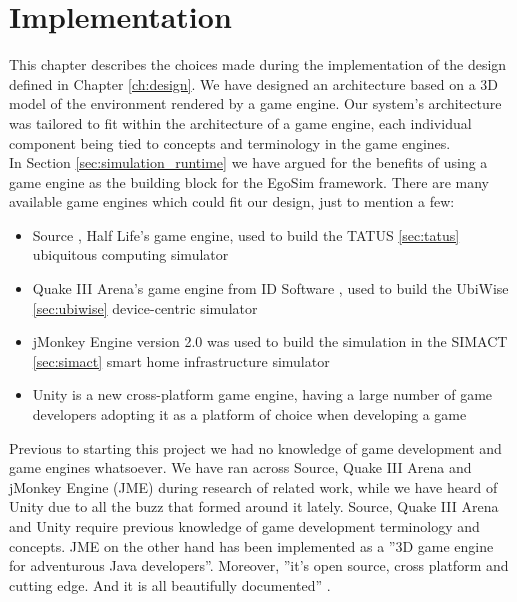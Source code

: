 \chapter{Implementation}\label{ch:implementation}
This chapter describes the choices made during the implementation of the design defined in Chapter \ref{ch:design}. We have designed an architecture based on a 3D model of the environment rendered by a game engine. Our system's architecture was tailored to fit within the architecture of a game engine, each individual component being tied to concepts and terminology in the game engines.\\ 

In Section \ref{sec:simulation_runtime} we have argued for the benefits of using a game engine as the building block for the EgoSim framework. There are many available game engines which could fit our design, just to mention a few:
\begin{itemize}
	\item Source \cite{valvesrc:online}, Half Life's game engine, used to build the TATUS \ref{sec:tatus} ubiquitous computing simulator
	\item Quake III Arena's game engine from ID Software \cite{q3a:online}, used to build the UbiWise \ref{sec:ubiwise} device-centric simulator
	\item jMonkey Engine version 2.0 \cite{jme:online} was used to build the simulation in the SIMACT \ref{sec:simact} smart home infrastructure simulator
	\item Unity \cite{unity:online} is a new cross-platform game engine, having a large number of game developers adopting it as a platform of choice when developing a game
\end{itemize}

Previous to starting this project we had no knowledge of game development and game engines whatsoever. We have ran across Source, Quake III Arena and jMonkey Engine (JME) during research of related work, while we have heard of Unity due to all the buzz that formed around it lately. Source, Quake III Arena and Unity require previous knowledge of game development terminology and concepts. JME on the other hand has been implemented as a ''3D game engine for adventurous Java developers''. Moreover, ''it's open source, cross platform and cutting edge. And it is all beautifully documented'' \cite{jme:online}.\\

